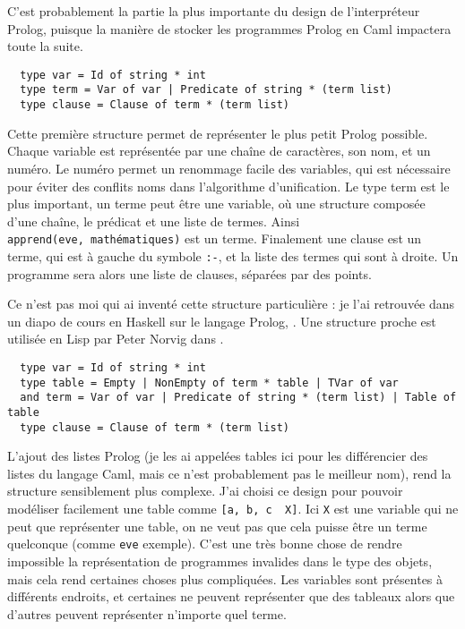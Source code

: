 \documentclass{article}
\begin{document}
C'est probablement la partie la plus importante du design de l'interpréteur Prolog, puisque la manière de stocker les programmes Prolog en Caml impactera toute la suite.

\begin{verbatim}
  type var = Id of string * int
  type term = Var of var | Predicate of string * (term list)
  type clause = Clause of term * (term list)
\end{verbatim}

Cette première structure permet de représenter le plus petit Prolog possible. Chaque variable est représentée par une chaîne de caractères, son nom, et un numéro. Le numéro permet un renommage facile des variables, qui est nécessaire pour éviter des conflits noms dans l'algorithme d'unification. Le type term est le plus important, un terme peut être une variable, où une structure composée d'une chaîne, le prédicat et une liste de termes. Ainsi \texttt{apprend(eve,\ mathématiques)} est un terme. Finalement une clause est un terme, qui est à gauche du symbole \texttt{:-}, et la liste des termes qui sont à droite. Un programme sera alors une liste de clauses, séparées par des points.

Ce n'est pas moi qui ai inventé cette structure particulière : je l'ai retrouvée dans un diapo de cours en Haskell sur le langage Prolog, \cite{Smaill}. Une structure proche est utilisée en Lisp par Peter Norvig dans \cite{Norvig}.

\begin{verbatim}
  type var = Id of string * int
  type table = Empty | NonEmpty of term * table | TVar of var
  and term = Var of var | Predicate of string * (term list) | Table of table
  type clause = Clause of term * (term list)
\end{verbatim}

L'ajout des listes Prolog (je les ai appelées tables ici pour les différencier des listes du langage Caml, mais ce n'est probablement pas le meilleur nom), rend la structure sensiblement plus complexe. J'ai choisi ce design pour pouvoir modéliser facilement une table comme \texttt{{[}a,\ b,\ c\ \textbar{}\ X{]}}. Ici \texttt{X} est une variable qui ne peut que représenter une table, on ne veut pas que cela puisse être un terme quelconque (comme \texttt{eve} exemple). C'est une très bonne chose de rendre impossible la représentation de programmes invalides dans le type des objets, mais cela rend certaines choses plus compliquées. Les variables sont présentes à différents endroits, et certaines ne peuvent représenter que des tableaux alors que d'autres peuvent représenter n'importe quel terme.
\end{document}
